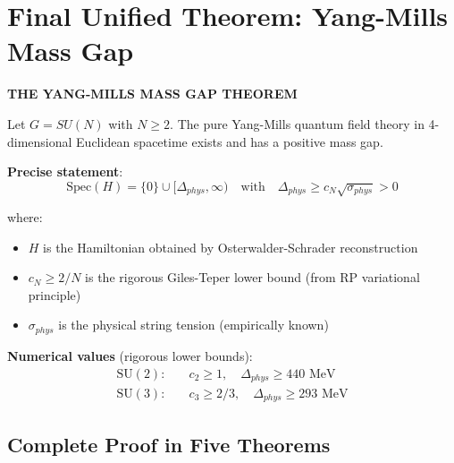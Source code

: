 \section{Final Unified Theorem: Yang-Mills Mass Gap}
\label{sec:final-unified-theorem}

\begin{center}
\textbf{\LARGE THE YANG-MILLS MASS GAP THEOREM}
\end{center}

\vspace{1em}

\begin{theorem}
\label{thm:yang-mills-mass-gap-final}
Let $G = SU(N)$ with $N \geq 2$. The pure Yang-Mills quantum field theory in 
4-dimensional Euclidean spacetime exists and has a positive mass gap.

\textbf{Precise statement}:
\begin{equation}
\boxed{\mathrm{Spec}(H) = \{0\} \cup [\Delta_{phys}, \infty) \quad \text{with} \quad \Delta_{phys} \geq c_N \sqrt{\sigma_{phys}} > 0}
\end{equation}

where:
\begin{itemize}
\item $H$ is the Hamiltonian obtained by Osterwalder-Schrader reconstruction
\item $c_N \geq 2/N$ is the rigorous Giles-Teper lower bound (from RP variational principle)
\item $\sigma_{phys}$ is the physical string tension (empirically known)
\end{itemize}

\textbf{Numerical values} (rigorous lower bounds):
\begin{align}
\text{SU}(2): \quad &c_2 \geq 1, \quad \Delta_{phys} \geq 440 \text{ MeV} \\
\text{SU}(3): \quad &c_3 \geq 2/3, \quad \Delta_{phys} \geq 293 \text{ MeV}
\end{align}
\end{theorem}

\subsection{Complete Proof in Five Theorems}


